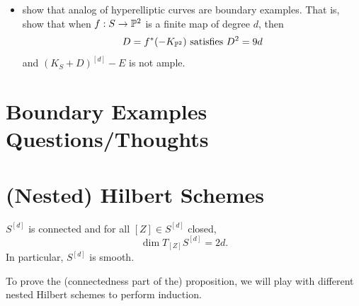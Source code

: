 \documentclass[12pt]{article}
\begin{document}
\begin{itemize}
    We define $D^{[d]}$ more precisely. Recall that the Hilbert scheme affords a universal family
    \[\begin{tikzcd}
        \mathcal{Z} \rar & X\times X^{[d]} \dar \rar & X\\
        & X^{[d]} &
    \end{tikzcd}\]
    Also inside $X\times X^{[d]}$ is $D\times X^{[d]}$, and we can form the intersection $\mathcal{Z} \cap (D\times X^{[d]})$, so that along the projection $X^{[d]}$, the fiber over a $Z$ is the subscheme $Z\cap D \subseteq X$. In this way, the fiber is nonempty exactly when $Z\cap D \neq \emptyset$, so we should consider $D^{[d]}$ to be the (scheme-theoretic) image of
    \[\mathcal{Z} \cap (D \times X^{[d]}) \to X^{[d]}.\]
    The image will already be closed (at least when $X$ is projective/proper). The fibers are all 0 dimensional, so the image has the s

    We need to check that this is actually an effective Cartier divisor---we can probably only hope to prove this for a surface so that we just have to show $D^{[d]}$ is pure codimension 1 and closed (or maybe take the closure).

    \item {\color{blue} show that analog of hyperelliptic curves are boundary examples. That is, show that when $f:S\to \P^2$ is a finite map of degree $d$, then
    \[D = f^*(-K_{\P^2}) \text{ satisfies } D^2=9d\]
    and $(K_S+D)^{[d]}-E$ is not ample.}
    
\end{itemize}



\section*{Boundary Examples Questions/Thoughts}



\section*{(Nested) Hilbert Schemes}

\begin{prop}
    $S^{[d]}$ is connected and for all $[Z]\in S^{[d]}$ closed,
    \[\dim T_{[Z]} S^{[d]} = 2d.\]
    In particular, $S^{[d]}$ is smooth.
\end{prop}

To prove the (connectedness part of the) proposition, we will play with different nested Hilbert schemes to perform induction.
\end{document}

